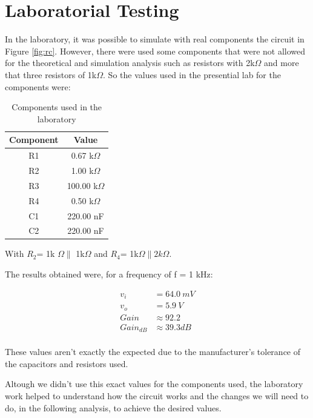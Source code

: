\section{Laboratorial Testing} \label{sec:Lab}

In the laboratory, it was possible to simulate with real components the circuit in Figure \ref{fig:rc}. However, there were used some components that were not allowed for the theoretical and simulation analysis such as resistors with 2k$\Omega$ and more that three resistors of 1k$\Omega$. So the values used in the presential lab for the components were:
\begin{table}[!htb]
\centering
  \begin{tabular}{|c | c|}
    \hline    
\bf Component  & \bf Value\\ \hline 
R1  & 0.67 k$\Omega$ \\ \hline 
R2  & 1.00 k$\Omega$ \\ \hline 
R3  & 100.00 k$\Omega$ \\ \hline 
R4  & 0.50 k$\Omega$ \\ \hline 
C1  & 220.00 nF \\ \hline 
C2  & 220.00 nF \\ \hline 

\end{tabular}
 \caption{Components used in the laboratory}\label{tab:labb}
\end{table}

With $R_2$= 1k $\Omega \parallel$ 1k$\Omega$ and $R_4$= 1k$\Omega \parallel 2k\Omega$.

The results obtained were, for a frequency of f = 1 kHz: 

\begin{align*}
  v_i &= 64.0\ mV \\
  v_o &= 5.9\ V \\
  Gain &\approx 92.2 \\
  Gain_{dB} &\approx 39.3 dB\\
\end{align*}

These values aren't exactly the expected due to the manufacturer's tolerance of the capacitors and resistors used.


Altough we didn't use this exact values for the components used, the laboratory work helped to understand how the circuit works and the changes we will need to do, in the following analysis, to achieve the desired values.

